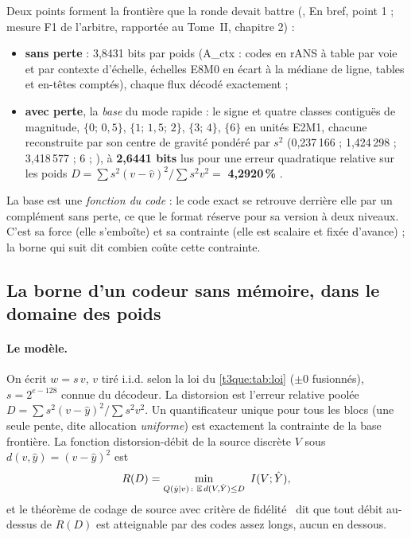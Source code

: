 Deux points forment la frontière que la ronde devait battre (, En bref, point 1 ; mesure F1 de l'arbitre, rapportée au Tome~II, chapitre 2) :
\begin{itemize}
\item \textbf{sans perte} : 3,8431 bits par poids (A\_ctx : codes en rANS à table par voie et par contexte d'échelle, échelles E8M0 en écart à la médiane de ligne, tables et en-têtes comptés), chaque flux décodé exactement \mes ;
\item \textbf{avec perte}, la \emph{base} du mode rapide : le signe et quatre classes contiguës de magnitude, $\{0;\,0{,}5\}$, $\{1;\,1{,}5;\,2\}$, $\{3;\,4\}$, $\{6\}$ en unités E2M1, chacune reconstruite par son centre de gravité pondéré par $s^2$ (0,237\,166 ; 1,424\,298 ; 3,418\,577 ; 6 ; ), à \textbf{2,6441 bits} lus pour une erreur quadratique relative sur les poids $D = \sum s^2 (v - \hat v)^2 / \sum s^2 v^2 = $ \textbf{4,2920\,\%} \mes.
\end{itemize}
La base est une \emph{fonction du code} : le code exact se retrouve derrière elle par un complément sans perte, ce que le format réserve pour sa version à deux niveaux. C'est sa force (elle s'emboîte) et sa contrainte (elle est scalaire et fixée d'avance) ; la borne qui suit dit combien coûte cette contrainte.

\subsection{La borne d'un codeur sans mémoire, dans le domaine des poids}

\paragraph{Le modèle.} On écrit $w = s\,v$, $v$ tiré i.i.d. selon la loi du \cref{t3que:tab:loi} ($\pm0$ fusionnés), $s = 2^{e-128}$ connue du décodeur. La distorsion est l'erreur relative poolée $D = \sum s^2 (v-\hat y)^2 / \sum s^2 v^2$. Un quantificateur unique pour tous les blocs (une seule pente, dite allocation \emph{uniforme}) est exactement la contrainte de la base frontière. La fonction distorsion-débit de la source discrète $V$ sous $d(v, \hat y) = (v - \hat y)^2$ est
\begin{equation}\label{t3que:eq:rd}
R(D) = \min_{Q(\hat y \mid v)\,:\ \mathbb{E}\, d(V, \hat Y) \le D}\ I(V ; \hat Y),
\end{equation}
et le théorème de codage de source avec critère de fidélité~\cite{shannon1959} dit que tout débit au-dessus de $R(D)$ est atteignable par des codes assez longs, aucun en dessous.

